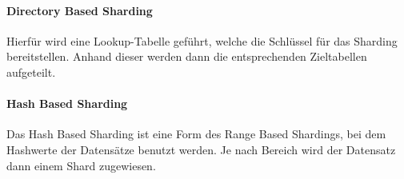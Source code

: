 \begin{flushleft}
    \paragraph{Directory Based Sharding}
    Hierfür wird eine Lookup-Tabelle geführt, welche die Schlüssel für das Sharding bereitstellen.
    Anhand dieser werden dann die entsprechenden Zieltabellen aufgeteilt.
\begin{flushleft}
\end{flushleft}
    \paragraph{Hash Based Sharding}
    Das Hash Based Sharding ist eine Form des Range Based Shardings, bei dem Hashwerte der Datensätze benutzt werden.
    Je nach Bereich wird der Datensatz dann einem Shard zugewiesen.
\end{flushleft}